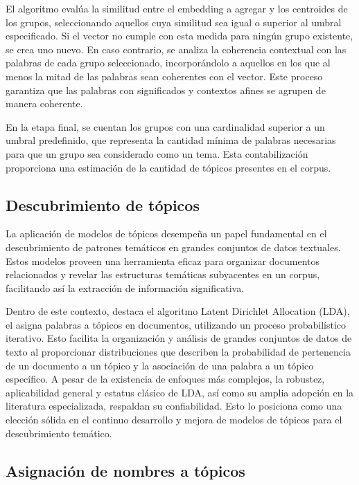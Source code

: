 El algoritmo evalúa la similitud entre el embedding a agregar y los centroides de los grupos, seleccionando aquellos cuya similitud sea igual o superior al umbral especificado. Si el vector no cumple con esta medida para ningún grupo existente, se crea uno nuevo. En caso contrario, se analiza la coherencia contextual con las palabras de cada grupo seleccionado, incorporándolo a aquellos en los que al menos la mitad de las palabras sean coherentes con el vector. Este proceso garantiza que las palabras con significados y contextos afines se agrupen de manera coherente.

En la etapa final, se cuentan los grupos con una cardinalidad superior a un umbral predefinido, que representa la cantidad mínima de palabras necesarias para que un grupo sea considerado como un tema. Esta contabilización proporciona una estimación de la cantidad de tópicos presentes en el corpus.

\subsection{Descubrimiento de t\'opicos}

La aplicación de modelos de tópicos desempeña un papel fundamental en el descubrimiento de patrones temáticos en grandes conjuntos de datos textuales. Estos modelos proveen una herramienta eficaz para organizar documentos relacionados y revelar las estructuras temáticas subyacentes en un corpus, facilitando así la extracción de información significativa.

Dentro de este contexto, destaca el algoritmo Latent Dirichlet Allocation (LDA), el asigna palabras a tópicos en documentos, utilizando un proceso probabilístico iterativo. Esto facilita la organización y análisis de grandes conjuntos de datos de texto al proporcionar distribuciones que describen la probabilidad de pertenencia de un documento a un tópico y la asociación de una palabra a un tópico específico.
A pesar de la existencia de enfoques más complejos, la robustez, aplicabilidad general y estatus clásico de LDA, así como su amplia adopción en la literatura especializada, respaldan su confiabilidad. Esto lo posiciona como una elección sólida en el continuo desarrollo y mejora de modelos de tópicos para el descubrimiento temático.

\subsection{Asignaci\'on de nombres a t\'opicos}

